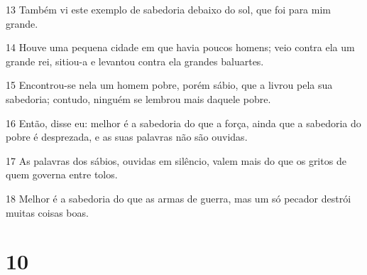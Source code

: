 \par 13 Também vi este exemplo de sabedoria debaixo do sol, que foi para mim grande.
\par 14 Houve uma pequena cidade em que havia poucos homens; veio contra ela um grande rei, sitiou-a e levantou contra ela grandes baluartes.
\par 15 Encontrou-se nela um homem pobre, porém sábio, que a livrou pela sua sabedoria; contudo, ninguém se lembrou mais daquele pobre.
\par 16 Então, disse eu: melhor é a sabedoria do que a força, ainda que a sabedoria do pobre é desprezada, e as suas palavras não são ouvidas.
\par 17 As palavras dos sábios, ouvidas em silêncio, valem mais do que os gritos de quem governa entre tolos.
\par 18 Melhor é a sabedoria do que as armas de guerra, mas um só pecador destrói muitas coisas boas.

\chapter{10}

